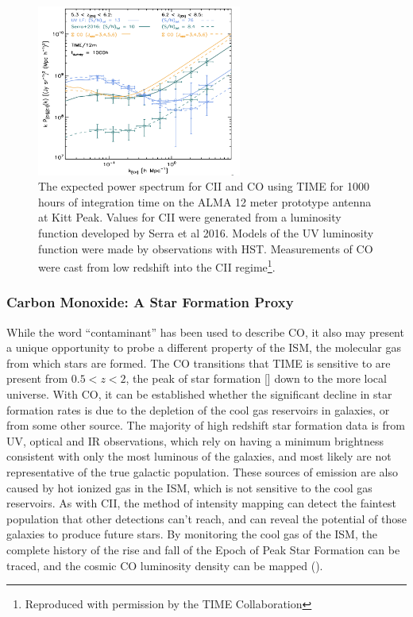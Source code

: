 \documentclass[manuscript]{aastex}
\begin{document}
\begin{figure}[H]
\centering
\captionsetup{width=0.6\textwidth}
\includegraphics[width=0.6\textwidth]{bock1.png}
\caption[The expected power spectrum for CII and CO using TIME. -()]{The expected power spectrum for CII and CO using TIME for 1000 hours of integration time on the ALMA 12 meter prototype antenna at Kitt Peak. Values for CII were generated from a luminosity function developed by Serra et al 2016. Models of the UV luminosity function were made by observations with HST. Measurements of CO were cast from low redshift into the CII regime\footnote{Reproduced with permission by the TIME Collaboration}.}
\vspace{-0.8cm}
\label{fig:coc2power}
\end{figure}

\subsubsection{\textbf{Carbon Monoxide: A Star Formation Proxy}}

While the word ``contaminant'' has been used to describe CO, it also may present a unique opportunity to probe a different property of the ISM, the molecular gas from which stars are formed. The CO transitions that TIME is sensitive to are present from $0.5 < z < 2$, the peak of star formation [\cite{Madau2014}] down to the more local universe.  With CO, it can be established whether the significant decline in star formation rates is due to the depletion of the cool gas reservoirs in galaxies, or from some other source. The majority of high redshift star formation data is from UV, optical and IR observations, which rely on having a minimum brightness consistent with only the most luminous of the galaxies, and most likely are not representative of the true galactic population. These sources of emission are also caused by hot ionized gas in the ISM, which is not sensitive to the cool gas reservoirs. As with CII, the method of intensity mapping can detect the faintest population that other detections can't reach, and can reveal the potential of those galaxies to produce future stars. By monitoring the cool gas of the ISM, the complete history of the rise and fall of the Epoch of Peak Star Formation can be traced, and the cosmic CO luminosity density can be mapped (\cite{Kovetz2017}). 
\end{document}
